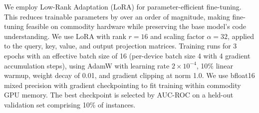 \documentclass[sigconf,nonacm]{acmart}
\newcommand{\projName}{\textsc{SWEzze}\xspace}
\begin{document}



We employ Low-Rank Adaptation (LoRA) for parameter-efficient fine-tuning. This reduces trainable parameters by over an order of magnitude, making fine-tuning feasible on commodity hardware while preserving the base model's code understanding. We use LoRA with rank $r=16$ and scaling factor $\alpha=32$, applied to the query, key, value, and output projection matrices. Training runs for 3 epochs with an effective batch size of 16 (per-device batch size 4 with 4 gradient accumulation steps), using AdamW with learning rate $2 \times 10^{-4}$, 10\% linear warmup, weight decay of 0.01, and gradient clipping at norm 1.0. We use bfloat16 mixed precision with gradient checkpointing to fit training within commodity GPU memory. The best checkpoint is selected by AUC-ROC on a held-out validation set comprising 10\% of instances.
\end{document}
